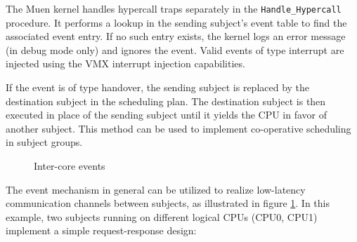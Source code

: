 The Muen kernel handles hypercall traps separately in the
\texttt{Handle\_Hypercall} procedure. It performs a lookup in the sending
subject's event table to find the associated event entry. If no such entry
exists, the kernel logs an error message (in debug mode only) and ignores the
event. Valid events of type interrupt are injected using the VMX interrupt
injection capabilities.

If the event is of type handover, the sending subject is replaced by the
destination subject in the scheduling plan. The destination subject is then
executed in place of the sending subject until it yields the CPU in favor of
another subject. This method can be used to implement co-operative scheduling
in subject groups.

\begin{figure}[h]
	\centering
	
	\caption{Inter-core events}
	\label{fig:inter-core-events}
\end{figure}

The event mechanism in general can be utilized to realize low-latency
communication channels between subjects, as illustrated in figure
\ref{fig:inter-core-events}. In this example, two subjects running on different
logical CPUs (CPU0, CPU1) implement a simple request-response design:

